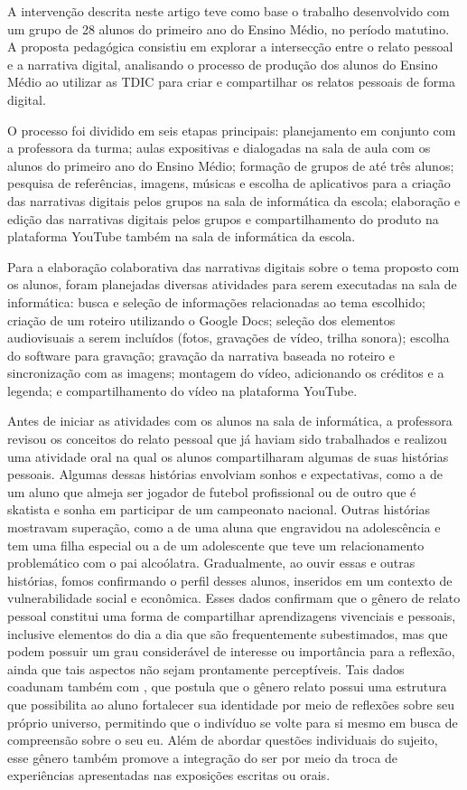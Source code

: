 \documentclass[portuguese]{textolivre}
\begin{document}
A intervenção descrita neste artigo teve como base o trabalho desenvolvido com um grupo de 28 alunos do primeiro ano do Ensino Médio, no período matutino. A proposta pedagógica consistiu em explorar a intersecção entre o relato pessoal e a narrativa digital, analisando o processo de produção dos alunos do Ensino Médio ao utilizar as TDIC para criar e compartilhar os relatos pessoais de forma digital.

O processo foi dividido em seis etapas principais: planejamento em conjunto com a professora da turma; aulas expositivas e dialogadas na sala de aula com os alunos do primeiro ano do Ensino Médio; formação de grupos de até três alunos; pesquisa de referências, imagens, músicas e escolha de aplicativos para a criação das narrativas digitais pelos grupos na sala de informática da escola; elaboração e edição das narrativas digitais pelos grupos e compartilhamento do produto na plataforma YouTube também na sala de informática da escola.

Para a elaboração colaborativa das narrativas digitais sobre o tema proposto com os alunos, foram planejadas diversas atividades para serem executadas na sala de informática: busca e seleção de informações relacionadas ao tema escolhido; criação de um roteiro utilizando o Google Docs; seleção dos elementos audiovisuais a serem incluídos (fotos, gravações de vídeo, trilha sonora); escolha do software para gravação; gravação da narrativa baseada no roteiro e sincronização com as imagens; montagem do vídeo, adicionando os créditos e a legenda; e compartilhamento do vídeo na plataforma YouTube.

Antes de iniciar as atividades com os alunos na sala de informática, a professora revisou os conceitos do relato pessoal que já haviam sido trabalhados e realizou uma atividade oral na qual os alunos compartilharam algumas de suas histórias pessoais. Algumas dessas histórias envolviam sonhos e expectativas, como a de um aluno que almeja ser jogador de futebol profissional ou de outro que é skatista e sonha em participar de um campeonato nacional. Outras histórias mostravam superação, como a de uma aluna que engravidou na adolescência e tem uma filha especial ou a de um adolescente que teve um relacionamento problemático com o pai alcoólatra. Gradualmente, ao ouvir essas e outras histórias, fomos confirmando o perfil desses alunos, inseridos em um contexto de vulnerabilidade social e econômica. Esses dados confirmam que o gênero de relato pessoal constitui uma forma de compartilhar aprendizagens vivenciais e pessoais, inclusive elementos do dia a dia que são frequentemente subestimados, mas que podem possuir um grau considerável de interesse ou importância para a reflexão, ainda que tais aspectos não sejam prontamente perceptíveis. Tais dados coadunam também com \textcite{aragão2016}, que postula que o gênero relato possui uma estrutura que possibilita ao aluno fortalecer sua identidade por meio de reflexões sobre seu próprio universo, permitindo que o indivíduo se volte para si mesmo em busca de compreensão sobre o seu eu. Além de abordar questões individuais do sujeito, esse gênero também promove a integração do ser por meio da troca de experiências apresentadas nas exposições escritas ou orais.
\end{document}
